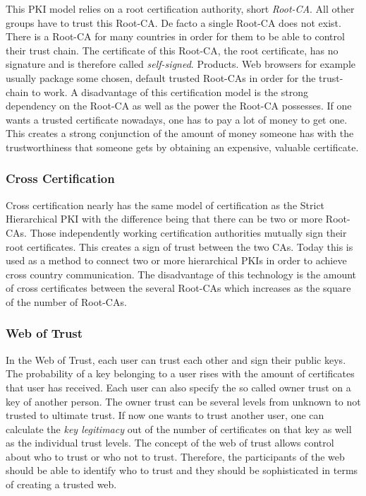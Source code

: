 This PKI model relies on a root certification authority, short
\textit{Root-CA}.  All other groups have to trust this Root-CA.  De facto a
single Root-CA does not exist. There is a Root-CA for many countries in order
for them to be able to control their trust chain.  The certificate of this
Root-CA, the root certificate, has no signature and is therefore called
\textit{self-signed}.  Products. Web browsers for example usually package some
chosen, default trusted Root-CAs in order for the trust-chain to work. A
disadvantage of this certification model is the strong dependency on the
Root-CA as well as the power the Root-CA possesses.  If one wants a trusted
certificate nowadays, one has to pay a lot of money to get one. This creates a
strong conjunction of the amount of money someone has with the trustworthiness
that someone gets by obtaining an expensive, valuable certificate.

\subsubsection{Cross Certification}

Cross certification nearly has the same model of certification as the Strict
Hierarchical PKI with the difference being that there can be two or more
Root-CAs. Those independently working certification authorities mutually
sign their root certificates. This creates a sign of trust between the two
CAs. Today this is used as a method to connect two or more hierarchical PKIs
in order to achieve cross country communication. The disadvantage of this
technology is the amount of cross certificates between the several Root-CAs
which increases as the square of the number of Root-CAs.

\subsubsection{Web of Trust}

In the Web of Trust, each user can trust each other and sign their public keys.
The probability of a key belonging to a user rises with the amount of certificates
that user has received. Each user can also specify the so called owner trust on
a key of another person. The owner trust can be several levels from unknown to
not trusted to ultimate trust. If now one wants to trust another user, one can
calculate the \textit{key legitimacy} out of the number of certificates on that
key as well as the individual trust levels. The concept of the web of trust allows
control about who to trust or who not to trust. Therefore, the participants of
the web should be able to identify who to trust and they should be sophisticated
in terms of creating a trusted web.

